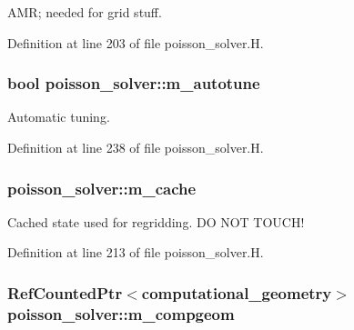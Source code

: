A\+MR; needed for grid stuff. 



Definition at line 203 of file poisson\+\_\+solver.\+H.

\subsubsection[{\texorpdfstring{m\+\_\+autotune}{m_autotune}}]{\setlength{\rightskip}{0pt plus 5cm}bool poisson\+\_\+solver\+::m\+\_\+autotune\hspace{0.3cm}{\ttfamily [protected]}}\hypertarget{classpoisson__solver_a3c4bdf0a6b9169e0d91c2214ec904986}{}\label{classpoisson__solver_a3c4bdf0a6b9169e0d91c2214ec904986}


Automatic tuning. 



Definition at line 238 of file poisson\+\_\+solver.\+H.

\subsubsection[{\texorpdfstring{m\+\_\+cache}{m_cache}}]{ poisson\+\_\+solver\+::m\+\_\+cache\hspace{0.3cm}{\ttfamily [protected]}}\hypertarget{classpoisson__solver_addea5f25694c74b27814db5136891b74}{}\label{classpoisson__solver_addea5f25694c74b27814db5136891b74}


Cached state used for regridding. DO N\+OT T\+O\+U\+C\+H! 



Definition at line 213 of file poisson\+\_\+solver.\+H.

\subsubsection[{\texorpdfstring{m\+\_\+compgeom}{m_compgeom}}]{\setlength{\rightskip}{0pt plus 5cm}Ref\+Counted\+Ptr$<${\bf computational\+\_\+geometry}$>$ poisson\+\_\+solver\+::m\+\_\+compgeom\hspace{0.3cm}{\ttfamily [protected]}}\hypertarget{classpoisson__solver_a5f6ffa00da060ea245b7d87016be451a}{}\label{classpoisson__solver_a5f6ffa00da060ea245b7d87016be451a}


